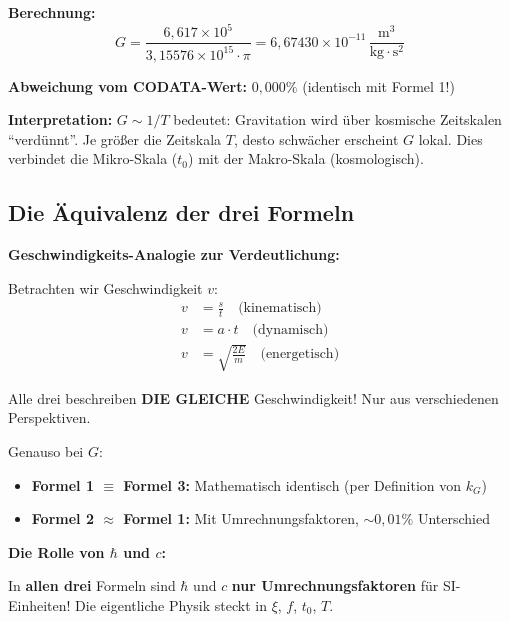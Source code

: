 	\textbf{Berechnung:}
	\begin{equation}
		G = \frac{6{,}617 \times 10^5}{3{,}15576 \times 10^{15} \cdot \pi} = 6{,}67430 \times 10^{-11}\,\frac{\text{m}^3}{\text{kg} \cdot \text{s}^2}
	\end{equation}
	
	\textbf{Abweichung vom CODATA-Wert:} \(0{,}000\%\) (identisch mit Formel 1!)
	
	\textbf{Interpretation:} \(G \sim 1/T\) bedeutet: Gravitation wird über kosmische Zeitskalen \enquote{verdünnt}. Je größer die Zeitskala \(T\), desto schwächer erscheint \(G\) lokal. Dies verbindet die Mikro-Skala (\(t_0\)) mit der Makro-Skala (kosmologisch).
	
	\subsection{Die Äquivalenz der drei Formeln}
	
	\textbf{Geschwindigkeits-Analogie zur Verdeutlichung:}
	
	Betrachten wir Geschwindigkeit \(v\):
	\begin{align}
		v &= \frac{s}{t} \quad \text{(kinematisch)} \\
		v &= a \cdot t \quad \text{(dynamisch)} \\
		v &= \sqrt{\frac{2E}{m}} \quad \text{(energetisch)}
	\end{align}
	
	Alle drei beschreiben \textbf{DIE GLEICHE} Geschwindigkeit! Nur aus verschiedenen Perspektiven.
	
	Genauso bei \(G\):
	\begin{itemize}
		\item \textbf{Formel 1 \(\equiv\) Formel 3:} Mathematisch identisch (per Definition von \(k_G\))
		\item \textbf{Formel 2 \(\approx\) Formel 1:} Mit Umrechnungsfaktoren, \(\sim0{,}01\%\) Unterschied
	\end{itemize}
	
	\textbf{Die Rolle von \(\hbar\) und \(c\):}
	
	In \textbf{allen drei} Formeln sind \(\hbar\) und \(c\) \textbf{nur Umrechnungsfaktoren} für SI-Einheiten! Die eigentliche Physik steckt in \(\xi\), \(f\), \(t_0\), \(T\).
	
	\begin{table}[h!]
		\centering
		\caption{Die drei Perspektiven auf \(G\) -- eine Konstante, drei Sichtweisen.}
	\end{table}
	
